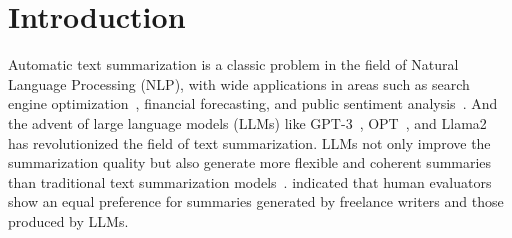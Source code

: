 \section{Introduction}





%


Automatic text summarization is a classic problem in the field of Natural Language Processing (NLP), with wide applications in areas such as search engine optimization~\cite{2019soe}, financial forecasting\cite{fintech}, and public sentiment analysis~\cite{twitter_news}. And the advent of large language models (LLMs) like GPT-3~\cite{NEURIPS2020_gpt3}, OPT~\cite{opt}, and Llama2~\cite{touvron2023llama2openfoundation} has revolutionized the field of text summarization. LLMs not only improve the summarization quality but also generate more flexible and coherent summaries than traditional text summarization models~\cite{luhn1958automatic, dong-etal-2018-banditsum, zhang-etal-2018-neural, t5, genest-lapalme-2012-fully}. \citet{zhang2024benchmarking} indicated that human evaluators show an equal preference for summaries generated by freelance writers and those produced by LLMs.


